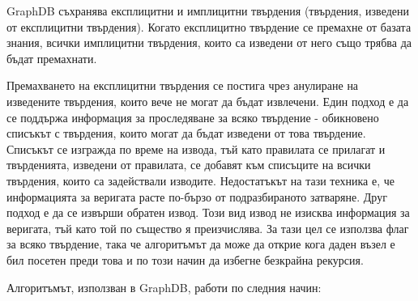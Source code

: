 \documentclass[12pt]{article}
\begin{document}
    GraphDB съхранява експлицитни и имплицитни твърдения (твърдения, изведени от експлицитни твърдения). Когато експлицитно твърдение се премахне от базата знания, всички имплицитни твърдения, които са изведени от него също трябва да бъдат премахнати.
    
    Премахването на експлицитни твърдения се постига чрез анулиране на изведените твърдения, които вече не могат да бъдат извлечени. Един подход е да се поддържа информация за проследяване за всяко твърдение - обикновено списъкът с твърдения, които могат да бъдат изведени от това твърдение. Списъкът се изгражда по време на извода, тъй като правилата се прилагат и твърденията, изведени от правилата, се добавят към списъците на всички твърдения, които са задействали изводите. Недостатъкът на тази техника е, че информацията за веригата расте по-бързо от подразбираното затваряне. Друг подход е да се извърши обратен извод. Този вид извод не изисква информация за веригата, тъй като той по същество я преизчислява. За тази цел се използва флаг за всяко твърдение, така че алгоритъмът да може да открие кога даден възел е бил посетен преди това и по този начин да избегне безкрайна рекурсия.

    Алгоритъмът, използван в GraphDB, работи по следния начин:
\end{document}
